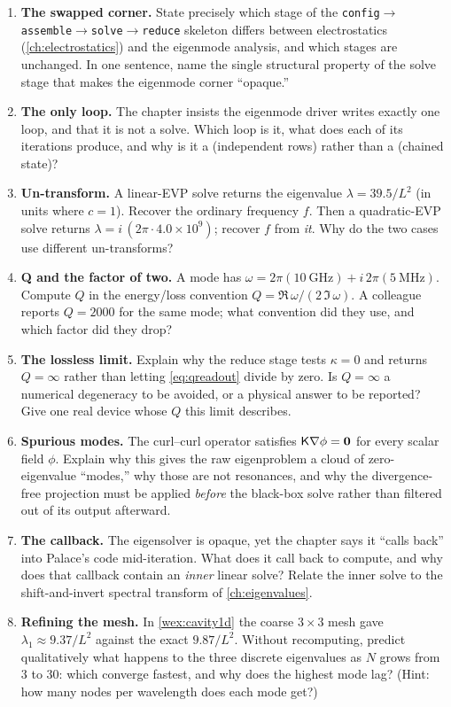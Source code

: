 \exercisessection
\begin{enumerate}[nosep]
  \item \textbf{The swapped corner.} State precisely which stage of the
  \texttt{config}$\to$\texttt{assemble}$\to$\texttt{solve}$\to$\texttt{reduce}
  skeleton differs between electrostatics (\cref{ch:electrostatics}) and the
  eigenmode analysis, and which stages are unchanged. In one sentence, name the
  single structural property of the solve stage that makes the eigenmode corner
  ``opaque.''
  \item \textbf{The only loop.} The chapter insists the eigenmode driver writes
  exactly one loop, and that it is not a solve. Which loop is it, what does each
  of its iterations produce, and why is it a  (independent rows) rather
  than a  (chained state)?
  \item \textbf{Un-transform.} A linear-EVP solve returns the eigenvalue
  $\lambda=39.5/L^2$ (in units where $c=1$). Recover the ordinary frequency $f$.
  Then a quadratic-EVP solve returns $\lambda=i\,(2\pi\cdot 4.0\times10^9)$;
  recover $f$ from \emph{it}. Why do the two cases use different un-transforms?
  \item \textbf{Q and the factor of two.} A mode has
  $\omega=2\pi(\SI{10}{\giga\hertz})+i\,2\pi(\SI{5}{\mega\hertz})$. Compute $Q$ in
  the energy/loss convention $Q=\Re\,\omega/(2\,\Im\,\omega)$. A colleague reports
  $Q=2000$ for the same mode; what convention did they use, and which factor did
  they drop?
  \item \textbf{The lossless limit.} Explain why the reduce stage tests
  $\kappa=0$ and returns $Q=\infty$ rather than letting \cref{eq:qreadout} divide
  by zero. Is $Q=\infty$ a numerical degeneracy to be avoided, or a physical
  answer to be reported? Give one real device whose $Q$ this limit describes.
  \item \textbf{Spurious modes.} The curl--curl operator satisfies
  $\mathsf{K}\nabla\phi=\mathbf 0$ for every scalar field $\phi$. Explain why this gives
  the raw eigenproblem a cloud of zero-eigenvalue ``modes,'' why those are not
  resonances, and why the divergence-free projection must be applied
  \emph{before} the black-box solve rather than filtered out of its output
  afterward.
  \item \textbf{The callback.} The eigensolver is opaque, yet the chapter says it
  ``calls back'' into Palace's code mid-iteration. What does it call back to
  compute, and why does that callback contain an \emph{inner} linear solve?
  Relate the inner solve to the shift-and-invert spectral transform of
  \cref{ch:eigenvalues}.
  \item \textbf{Refining the mesh.} In \cref{wex:cavity1d} the coarse $3\times3$
  mesh gave $\lambda_1\approx 9.37/L^2$ against the exact $9.87/L^2$. Without
  recomputing, predict qualitatively what happens to the three discrete
  eigenvalues as $N$ grows from $3$ to $30$: which converge fastest, and why does
  the highest mode lag? (Hint: how many nodes per wavelength does each mode get?)
\end{enumerate}
